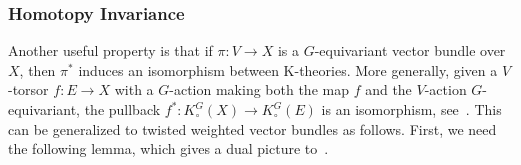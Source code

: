 \documentclass[12pt]{amsart}
\newcommand{\Kgroup}{K_{\circ}}
\theoremstyle{definition}
\begin{document}
\subsubsection{Homotopy Invariance}\label{sec: homotopy invariance}

Another useful property is that if $\pi:V\rightarrow X$ is a $G$-equivariant vector bundle over $X$, then $\pi^*$ induces an isomorphism between K-theories. More generally, given a $V$-torsor $f:E\rightarrow X$ with a $G$-action making both the map $f$ and the $V$-action $G$-equivariant, the pullback $f^*:\Kgroup^G(X)\rightarrow\Kgroup^G(E)$ is an isomorphism, see~\cite[Theorem 4.1]{Thomason-equivariantKtheory}.
This can be generalized to twisted weighted vector bundles as follows. First, we need the following lemma, which gives a dual picture to~\cite[Proposition 3.8]{Arena-Obinna}.
\end{document}
